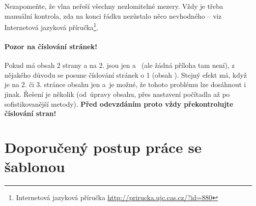 Nezapomeňte, že vlna neřeší všechny nezlomitelné mezery. Vždy je třeba manuální kontrola, zda na konci řádku nezůstalo něco nevhodného -- viz Internetová jazyková příručka\footnote{Internetová jazyková příručka \url{http://prirucka.ujc.cas.cz/?id=880}}.

\paragraph {Pozor na číslování stránek!} Pokud má obsah 2 strany a na 2. jsou jen  a~ (ale žádná příloha tam není), z nějakého důvodu se posune číslování stránek o 1 (obsah ). Stejný efekt má, když je na 2. či 3. stránce obsahu jen  a~je možné, že tohoto problému lze dosáhnout i jinak. Řešení je několik (od~úpravy obsahu, přes nastavení počítadla až po sofistikovanější metody). \textbf{Před odevzdáním proto vždy překontrolujte číslování stran!}


\section*{Doporučený postup práce se šablonou}


